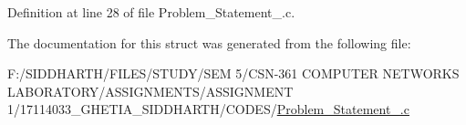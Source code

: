 Definition at line 28 of file Problem\+\_\+\+Statement\+\_.\+c.



The documentation for this struct was generated from the following file\+:\begin{DoxyCompactItemize}
\item 
F\+:/\+S\+I\+D\+D\+H\+A\+R\+T\+H/\+F\+I\+L\+E\+S/\+S\+T\+U\+D\+Y/\+S\+E\+M 5/\+C\+S\+N-\/361 C\+O\+M\+P\+U\+T\+E\+R N\+E\+T\+W\+O\+R\+K\+S L\+A\+B\+O\+R\+A\+T\+O\+R\+Y/\+A\+S\+S\+I\+G\+N\+M\+E\+N\+T\+S/\+A\+S\+S\+I\+G\+N\+M\+E\+N\+T 1/17114033\+\_\+\+G\+H\+E\+T\+I\+A\+\_\+\+S\+I\+D\+D\+H\+A\+R\+T\+H/\+C\+O\+D\+E\+S/\mbox{\hyperlink{_problem___statement__3_8c}{Problem\+\_\+\+Statement\+\_.\+c}}\end{DoxyCompactItemize}
